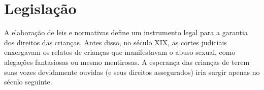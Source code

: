 \section{Legislação}\label{sec:regras}%




A elaboração de leis e normativas define um instrumento legal para a garantia dos direitos das crianças. Antes disso, no século XIX,
as cortes judiciais enxergavam os relatos de crianças que manifestavam o abuso sexual, como alegações fantasiosas ou mesmo mentirosas. A esperança das crianças de terem suas vozes devidamente ouvidas (e seus direitos assegurados) iria surgir apenas no século seguinte.



